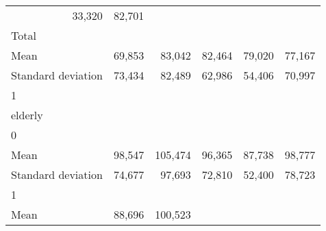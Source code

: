 \begin{tabular}{llllll}
  \multicolumn{1}{r}{33,320} &
  \multicolumn{1}{r}{82,701} \\
\multicolumn{1}{l}{\hspace{3em}Total} &
  \multicolumn{1}{|r}{} &
  \multicolumn{1}{r}{} &
  \multicolumn{1}{r}{} &
  \multicolumn{1}{r}{} &
  \multicolumn{1}{r}{} \\
\multicolumn{1}{l}{\hspace{4em}Mean} &
  \multicolumn{1}{|r}{69,853} &
  \multicolumn{1}{r}{83,042} &
  \multicolumn{1}{r}{82,464} &
  \multicolumn{1}{r}{79,020} &
  \multicolumn{1}{r}{77,167} \\
\multicolumn{1}{l}{\hspace{4em}Standard deviation} &
  \multicolumn{1}{|r}{73,434} &
  \multicolumn{1}{r}{82,489} &
  \multicolumn{1}{r}{62,986} &
  \multicolumn{1}{r}{54,406} &
  \multicolumn{1}{r}{70,997} \\
\multicolumn{1}{l}{\hspace{1em}1} &
  \multicolumn{1}{|r}{} &
  \multicolumn{1}{r}{} &
  \multicolumn{1}{r}{} &
  \multicolumn{1}{r}{} &
  \multicolumn{1}{r}{} \\
\multicolumn{1}{l}{\hspace{2em}elderly} &
  \multicolumn{1}{|r}{} &
  \multicolumn{1}{r}{} &
  \multicolumn{1}{r}{} &
  \multicolumn{1}{r}{} &
  \multicolumn{1}{r}{} \\
\multicolumn{1}{l}{\hspace{3em}0} &
  \multicolumn{1}{|r}{} &
  \multicolumn{1}{r}{} &
  \multicolumn{1}{r}{} &
  \multicolumn{1}{r}{} &
  \multicolumn{1}{r}{} \\
\multicolumn{1}{l}{\hspace{4em}Mean} &
  \multicolumn{1}{|r}{98,547} &
  \multicolumn{1}{r}{105,474} &
  \multicolumn{1}{r}{96,365} &
  \multicolumn{1}{r}{87,738} &
  \multicolumn{1}{r}{98,777} \\
\multicolumn{1}{l}{\hspace{4em}Standard deviation} &
  \multicolumn{1}{|r}{74,677} &
  \multicolumn{1}{r}{97,693} &
  \multicolumn{1}{r}{72,810} &
  \multicolumn{1}{r}{52,400} &
  \multicolumn{1}{r}{78,723} \\
\multicolumn{1}{l}{\hspace{3em}1} &
  \multicolumn{1}{|r}{} &
  \multicolumn{1}{r}{} &
  \multicolumn{1}{r}{} &
  \multicolumn{1}{r}{} &
  \multicolumn{1}{r}{} \\
\multicolumn{1}{l}{\hspace{4em}Mean} &
  \multicolumn{1}{|r}{88,696} &
  \multicolumn{1}{r}{100,523} &

\end{tabular}
